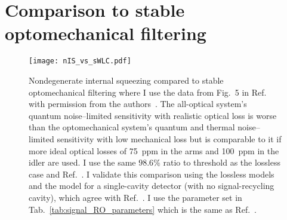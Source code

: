 \section{Comparison to stable optomechanical filtering} %
\label{sec:nIS_vs_sWLC}

\begin{figure}
	\centering
	\texttt{[image: nIS\_vs\_sWLC.pdf]}
	\caption{Nondegenerate internal squeezing compared to stable optomechanical filtering where I use the data from Fig.~5 in Ref.~\cite{liBroadbandSensitivityImprovement2020} with permission from the authors~\cite{xiangLiPersonalCommunication}. The all-optical system's quantum noise--limited sensitivity with realistic optical loss is worse than the optomechanical system's quantum and thermal noise--limited sensitivity with low mechanical loss but is comparable to it if more ideal optical losses of 75~ppm in the arms and 100~ppm in the idler are used. I use the same $98.6\%$ ratio to threshold as the lossless case and Ref.~\cite{liBroadbandSensitivityImprovement2020}. I validate this comparison using the lossless models and the model for a single-cavity detector (with no signal-recycling cavity), which agree with Ref.~\cite{liBroadbandSensitivityImprovement2020}. I use the parameter set in Tab.~\ref{tab:signal_RO_parameters} which is the same as Ref.~\cite{liBroadbandSensitivityImprovement2020}.}
	\label{fig:nIS_vs_sWLC}
\end{figure}

